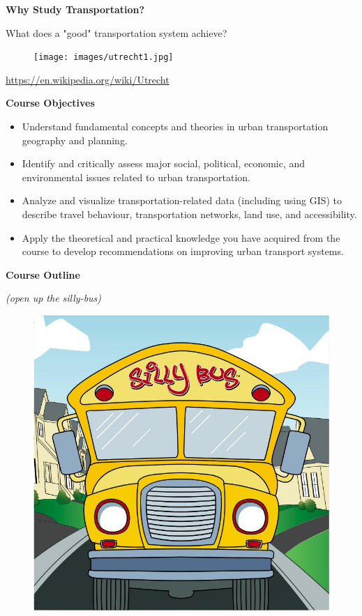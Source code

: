 \documentclass[aspectratio=169]{beamer}
\begin{document}

\begin{frame}
	\textbf{Why Study Transportation?}
	
	\vspace{4mm}
	
	What does a "good" transportation system achieve?
	
	
	
	\begin{figure}
		\centering
		\texttt{[image: images/utrecht1.jpg]}
	\end{figure}
	\tiny\url{https://en.wikipedia.org/wiki/Utrecht}
	
\end{frame}



\begin{frame}

\textbf{Course Objectives}
		\small
		\begin{itemize}
			\item Understand fundamental concepts and theories in urban transportation geography and planning.
			
			\item Identify and critically assess major social, political, economic, and environmental issues related to urban transportation.
			
			\item Analyze and visualize transportation-related data (including using GIS) to describe travel behaviour, transportation networks, land use, and accessibility.
			
			\item Apply the theoretical and practical knowledge you have acquired from the course to develop recommendations on improving urban transport systems.
		\end{itemize}

\end{frame}





\begin{frame}
	\LARGE{\textbf{Course Outline}}
	
	\vspace{4mm}
	
	\small
	\textit{(open up the silly-bus)}
	
	\begin{figure}
		\includegraphics[width=0.4\linewidth]{images/silly-bus.jpg}
	\end{figure}
\end{frame}
\end{document}
